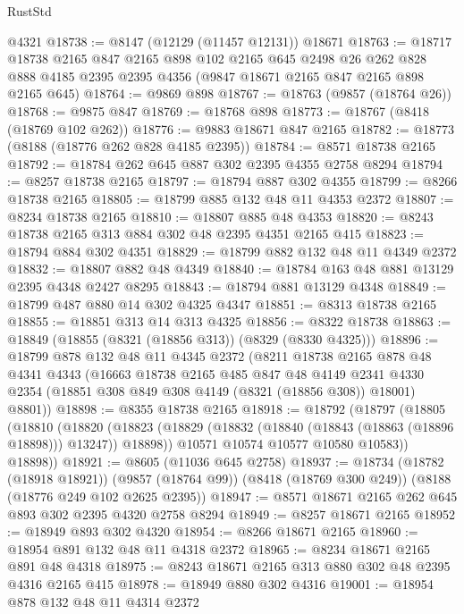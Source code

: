 \begin{lexlean}{RustStd}
\begin{coremodule}
    @4321
@18738 := @8147 (@12129 (@11457 @12131)) @18671
@18763 := @18717
    @18738
    @2165
    @847
    @2165
    @898
    @102
    @2165
    @645
    @2498
    @26
    @262
    @828
    @888
    @4185
    @2395
    @2395
    @4356
    (@9847 @18671 @2165 @847 @2165 @898 @2165 @645)
@18764 := @9869 @898
@18767 := @18763 (@9857 (@18764 @26))
@18768 := @9875 @847
@18769 := @18768 @898
@18773 := @18767 (@8418 (@18769 @102 @262))
@18776 := @9883 @18671 @847 @2165
@18782 := @18773 (@8188 (@18776 @262 @828 @4185 @2395))
@18784 := @8571 @18738 @2165
@18792 := @18784 @262 @645 @887 @302 @2395 @4355 @2758 @8294
@18794 := @8257 @18738 @2165
@18797 := @18794 @887 @302 @4355
@18799 := @8266 @18738 @2165
@18805 := @18799 @885 @132 @48 @11 @4353 @2372
@18807 := @8234 @18738 @2165
@18810 := @18807 @885 @48 @4353
@18820 := @8243 @18738 @2165 @313 @884 @302 @48 @2395 @4351 @2165 @415
@18823 := @18794 @884 @302 @4351
@18829 := @18799 @882 @132 @48 @11 @4349 @2372
@18832 := @18807 @882 @48 @4349
@18840 := @18784 @163 @48 @881 @13129 @2395 @4348 @2427 @8295
@18843 := @18794 @881 @13129 @4348
@18849 := @18799 @487 @880 @14 @302 @4325 @4347
@18851 := @8313 @18738 @2165
@18855 := @18851 @313 @14 @313 @4325
@18856 := @8322 @18738
@18863 := @18849 (@18855 (@8321 (@18856 @313)) (@8329 (@8330 @4325)))
@18896 := @18799
    @878
    @132
    @48
    @11
    @4345
    @2372
    (@8211
      @18738
      @2165
      @878
      @48
      @4341
      @4343
      (@16663
        @18738
        @2165
        @485
        @847
        @48
        @4149
        @2341
        @4330
        @2354
        (@18851 @308 @849 @308 @4149 (@8321 (@18856 @308)) @18001)
        @8801))
@18898 := @8355 @18738 @2165
@18918 := @18792
    (@18797
      (@18805
        (@18810
          (@18820
            (@18823 (@18829 (@18832 (@18840 (@18843 (@18863 (@18896 @18898))) @13247)) @18898))
            @10571
            @10574
            @10577
            @10580
            @10583))
        @18898))
@18921 := @8605 (@11036 @645 @2758)
@18937 := @18734
    (@18782 (@18918 @18921))
    (@9857 (@18764 @99))
    (@8418 (@18769 @300 @249))
    (@8188 (@18776 @249 @102 @2625 @2395))
@18947 := @8571 @18671 @2165 @262 @645 @893 @302 @2395 @4320 @2758 @8294
@18949 := @8257 @18671 @2165
@18952 := @18949 @893 @302 @4320
@18954 := @8266 @18671 @2165
@18960 := @18954 @891 @132 @48 @11 @4318 @2372
@18965 := @8234 @18671 @2165 @891 @48 @4318
@18975 := @8243 @18671 @2165 @313 @880 @302 @48 @2395 @4316 @2165 @415
@18978 := @18949 @880 @302 @4316
@19001 := @18954
    @878
    @132
    @48
    @11
    @4314
    @2372

\end{coremodule}
\end{lexlean}
